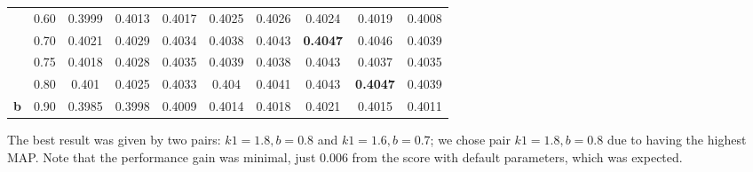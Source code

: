 \begin{table}[tbp]
\begin{tabular}{|cc|cccccccc|}
\multicolumn{1}{|c|}{}                             & 0.60                      & \multicolumn{1}{c|}{\cellcolor[HTML]{F9C366}0.3999} & \multicolumn{1}{c|}{\cellcolor[HTML]{FED766}0.4013} & \multicolumn{1}{c|}{\cellcolor[HTML]{F2D564}0.4017} & \multicolumn{1}{c|}{\cellcolor[HTML]{CEC95F}0.4025} & \multicolumn{1}{c|}{\cellcolor[HTML]{C9C85E}0.4026} & \multicolumn{1}{c|}{\cellcolor[HTML]{D2CB60}0.4024}          & \multicolumn{1}{c|}{\cellcolor[HTML]{E9D263}0.4019}          & \cellcolor[HTML]{FCD066}0.4008 \\ %
\multicolumn{1}{|c|}{}                             & 0.70                      & \multicolumn{1}{c|}{\cellcolor[HTML]{E0CF62}0.4021} & \multicolumn{1}{c|}{\cellcolor[HTML]{BCC35C}0.4029} & \multicolumn{1}{c|}{\cellcolor[HTML]{A5BC59}0.4034} & \multicolumn{1}{c|}{\cellcolor[HTML]{93B656}0.4038} & \multicolumn{1}{c|}{\cellcolor[HTML]{7DAE52}0.4043} & \multicolumn{1}{c|}{\cellcolor[HTML]{6AA84F}\textbf{0.4047}} & \multicolumn{1}{c|}{\cellcolor[HTML]{6FAA50}0.4046}          & \cellcolor[HTML]{8FB455}0.4039 \\ %
\multicolumn{1}{|c|}{}                             & 0.75                     & \multicolumn{1}{c|}{\cellcolor[HTML]{EDD464}0.4018} & \multicolumn{1}{c|}{\cellcolor[HTML]{C0C55D}0.4028} & \multicolumn{1}{c|}{\cellcolor[HTML]{A1BA58}0.4035} & \multicolumn{1}{c|}{\cellcolor[HTML]{8FB455}0.4039} & \multicolumn{1}{c|}{\cellcolor[HTML]{93B656}0.4038} & \multicolumn{1}{c|}{\cellcolor[HTML]{7DAE52}0.4043}          & \multicolumn{1}{c|}{\cellcolor[HTML]{98B756}0.4037}          & \cellcolor[HTML]{A1BA58}0.4035 \\ %
\multicolumn{1}{|c|}{}                             & 0.80 & \multicolumn{1}{c|}{\cellcolor[HTML]{FDD366}0.401}  & \multicolumn{1}{c|}{\cellcolor[HTML]{CEC95F}0.4025} & \multicolumn{1}{c|}{\cellcolor[HTML]{AABD59}0.4033} & \multicolumn{1}{c|}{\cellcolor[HTML]{8AB354}0.404}  & \multicolumn{1}{c|}{\cellcolor[HTML]{86B154}0.4041} & \multicolumn{1}{c|}{\cellcolor[HTML]{7DAE52}0.4043}          & \multicolumn{1}{c|}{\cellcolor[HTML]{6AA84F}\textbf{0.4047}} & \cellcolor[HTML]{8FB455}0.4039 \\ %
\multicolumn{1}{|c|}{\multirow{-8}{*}{\textbf{b}}} & 0.90 & \multicolumn{1}{c|}{\cellcolor[HTML]{F3AF66}0.3985} & \multicolumn{1}{c|}{\cellcolor[HTML]{F8C266}0.3998} & \multicolumn{1}{c|}{\cellcolor[HTML]{FDD166}0.4009} & \multicolumn{1}{c|}{\cellcolor[HTML]{FFD966}0.4014} & \multicolumn{1}{c|}{\cellcolor[HTML]{EDD464}0.4018} & \multicolumn{1}{c|}{\cellcolor[HTML]{E0CF62}0.4021}          & \multicolumn{1}{c|}{\cellcolor[HTML]{FBD866}0.4015}          & \cellcolor[HTML]{FDD466}0.4011 \\
\bottomrule
\end{tabular}
\end{table}
The best result was given by two pairs: $k1=1.8, b=0.8$ and $k1=1.6, b=0.7$; we chose pair $k1=1.8, b=0.8$ due to having the highest \ac{MAP}.  Note that the performance gain was minimal, just $0.006$ from the score with default parameters, which was expected.